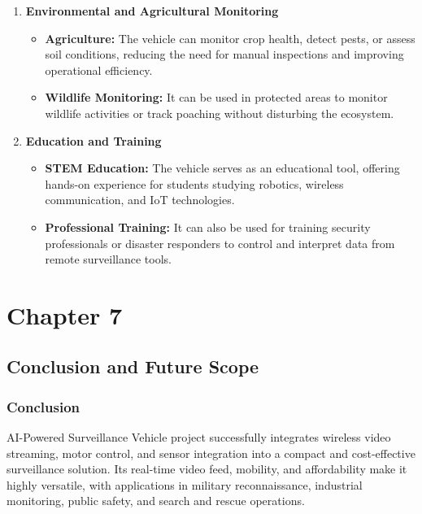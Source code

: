 \documentclass[12pt,a4paper]{report}
\begin{document}
\begin{enumerate}
    \item \textbf{Environmental and Agricultural Monitoring}
    \begin{itemize}
        \item \textbf{Agriculture:} The vehicle can monitor crop health, detect pests, or assess soil conditions, reducing the need for manual inspections and improving operational efficiency.
        \item \textbf{Wildlife Monitoring:} It can be used in protected areas to monitor wildlife activities or track poaching without disturbing the ecosystem.
    \end{itemize}
    
    \item \textbf{Education and Training}
    \begin{itemize}
        \item \textbf{STEM Education:} The vehicle serves as an educational tool, offering hands-on experience for students studying robotics, wireless communication, and IoT technologies.
        \item \textbf{Professional Training:} It can also be used for training security professionals or disaster responders to control and interpret data from remote surveillance tools.
    \end{itemize}
\end{enumerate}







	{\vfill \chapter*{\centering \vfill Chapter 7 \vfill}\vfill}
	\thispagestyle{empty}
	\newpage
	\label{Conclusion and Future Scope}
	\section{Conclusion and Future Scope}


\label{Conclusion}
\subsection{Conclusion}
AI-Powered Surveillance Vehicle project successfully integrates wireless video streaming, motor control, and sensor integration into a compact and cost-effective surveillance solution. Its real-time video feed, mobility, and affordability make it highly versatile, with applications in military reconnaissance, industrial monitoring, public safety, and search and rescue operations.
\end{document}
